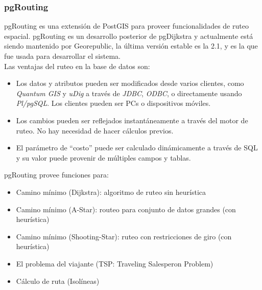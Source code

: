       \subsubsection{pgRouting} %
      \label{sec:pgrouting}
        pgRouting es una extensi\'on  de  PostGIS para proveer funcionalidades de ruteo espacial. pgRouting es un desarrollo posterior de pgDijkstra y actualmente está siendo mantenido por Georepublic, la última versi\'on estable es la 2.1, y es la que fue usada para desarrollar el sistema.\\

        Las ventajas del ruteo en la base de datos son:
        \begin{itemize}
          \item Los datos y atributos pueden ser modificados desde varios clientes, como \emph{Quantum GIS} y \emph{uDig} a través de \emph{JDBC}, \emph{ODBC}, o directamente usando \emph{Pl/pgSQL}. Los clientes pueden ser PCs o dispositivos móviles.
          \item Los cambios pueden ser reflejados instantáneamente a través del motor de ruteo. No hay necesidad de hacer cálculos previos.
          \item El parámetro de ``costo'' puede ser calculado dinámicamente a través de SQL y su valor puede provenir de múltiples campos y tablas.
        \end{itemize}

        pgRouting provee funciones para:
        \begin{itemize}
          \item Camino mínimo (Dijkstra): algoritmo de ruteo sin heurística
          \item Camino mínimo (A-Star): routeo para conjunto de datos grandes (con heurística)
          \item Camino mínimo (Shooting-Star): ruteo con restricciones de giro (con heurística)
          \item El problema del viajante (TSP: Traveling Salesperon Problem)
          \item Cálculo de ruta (Isolíneas)
        \end{itemize}


